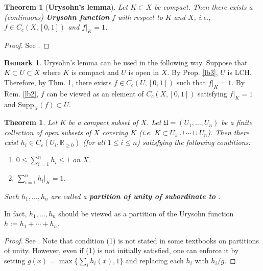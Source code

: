 \documentclass[12pt,b5paper,notitlepage]{article}
\theoremstyle{definition}
\newtheorem{rem}[df]{Remark}
\theoremstyle{plain}
\newtheorem{thm}[df]{Theorem}
\newcommand{\fk}{\mathfrak}
\newcommand{\Rbb}{\mathbb R}
\newcommand{\Supp}{\mathrm{Supp}}
\newcommand{\dps}{\displaystyle}
\numberwithin{equation}{section}
\begin{document}
\begin{thm}[\textbf{Urysohn's lemma}]\label{lb56}
Let $K\subset X$ be compact. Then there exists a (continuous) \textbf{Urysohn function}  $f$ with respect to $K$ and $X$, i.e., $f\in C_c(X,[0,1])$ and $f|_K=1$.
\end{thm}

\begin{proof}
See \cite[Sec. 15.4]{Gui-A}.
\end{proof}


\begin{rem}\label{lb57}
Urysohn's lemma can be used in the following way. Suppose that $K\subset U\subset X$ where $K$ is compact and $U$ is open in $X$. By Prop. \ref{lb3}, $U$ is LCH. Therefore, by Thm. \ref{lb56}, there exists $f\in C_c(U,[0,1])$ such that $f|_K=1$. By Rem. \ref{lb2}, $f$ can be viewed as an element of $C_c(X,[0,1])$ satisfying $f|_K=1$ and $\Supp_X(f)\subset U$.
\end{rem}


\begin{thm}\label{lb100}
Let $K$ be a compact subset of $X$. Let $\fk U=(U_1,\dots,U_n)$ be a finite collection of open subsets of $X$ covering $K$ (i.e. $K\subset U_1\cup\cdots\cup U_n$). Then there exist $h_i\in C_c(U_i,\Rbb_{\geq0})$ (for all $1\leq i\leq n$) satisfying the following conditions:
\begin{enumerate}[label=(\arabic*)]
\item $0\leq \dps \sum_{i=1}^nh_i\leq 1$ on $X$. 
\item  $\dps\sum_{i=1}^nh_i\big|_K=1$.
\end{enumerate}
Such $h_1,\dots,h_n$ are called a \textbf{partition of unity of  subordinate to \pmb{$\fk U$}}. 
\end{thm}

In fact, $h_1,\dots,h_n$ should be viewed as a partition of the Urysohn function $h:=h_1+\cdots+h_n$.


\begin{proof}
See \cite[Sec. 15.4]{Gui-A}. Note that condition (1) is not stated in some textbooks on partitions of unity.  However, even if (1) is not initially satisfied, one can enforce it by setting $g(x)=\max\{\sum_i h_i(x),1\}$ and replacing each $h_i$ with $h_i/g$.
\end{proof}
\end{document}
